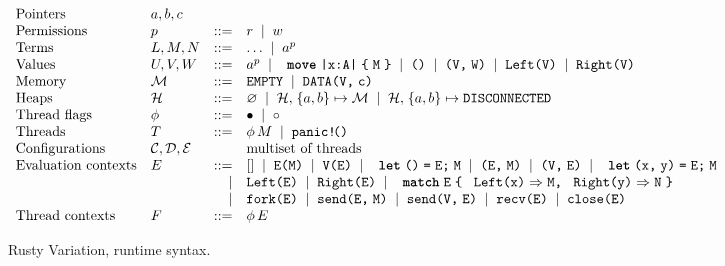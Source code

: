 \begin{figure*}
  \begin{mdframed}\begin{highlight}
    \centering
    \(
    \begin{array}{llrl}
      \text{Pointers}
      &\tm{a}, \tm{b}, \tm{c}
      \\
      \text{Permissions}
      &\tm{p}
      &::= & \st{r}
             \sep \st{w}
      \\
      \text{Terms}
      &\tm{L}, \tm{M}, \tm{N}
      &::= & \dots
             \sep \tm{a}^{\st{p}}
      \\
      \text{Values}
      &\tm{U}, \tm{V}, \tm{W}
      &::= & \tm{a}^{\st{p}}
             \sep \rvAbs[A]{x}{M}
             \sep \rvUnit
             \sep \rvPair{V}{W}
             \sep \rvInl{V}
             \sep \rvInr{V}
      \\
      \text{Memory}
      &\tm{\rvMem{M}}
      &::= & \rvMemEmp
             \sep \rvMemData{V}{c}
      \\
      \text{Heaps}
      &\tm{\rvHeap{H}}
      &::= & \rvHeapEmp
             \sep \rvHeapData{\rvHeap{H}}{a}{b}{\rvMem{M}}
             \sep \rvHeapDisc{\rvHeap{H}}{a}{b}
      \\
      \text{Thread flags}
      &\tm{\phi}
      &::= & \rvFlagMain
             \sep \rvFlagChild
      \\
      \text{Threads}
      &\tm{T}
      &::= & \rvThread{\phi}{M}
             \sep \rvPanic
      \\
      \text{Configurations}
      &\rvConf{C}, \rvConf{D}, \rvConf{E}
      &    & \text{multiset of threads}
      \\
      \text{Evaluation contexts}
      &\tm{E}
      &::= & \rvHole
             \sep \rvApp{E}{M}
             \sep \rvApp{V}{E}
             \sep \rvLetUnit{E}{M}
             \sep \rvPair{E}{M}
             \sep \rvPair{V}{E}
             \sep \rvLetPair{x}{y}{E}{M}
      \\
      &
      &\mid& \rvInl{E}
             \sep \rvInr{E}
             \sep \rvCaseSum{E}{x}{M}{y}{N}
      \\
      &
      &\mid& \rvFork{E}
             \sep \rvSend{E}{M}
             \sep \rvSend{V}{E}
             \sep \rvRecv{E}
             \sep \rvClose{E}
      \\
      \text{Thread contexts}
      &\tm{F}
      &::= & \rvThread{\phi}{E}
    \end{array}
    \)
  \end{highlight}\end{mdframed}
  \caption{Rusty Variation, runtime syntax.}
  \label{fig:rv-runtime}
\end{figure*}

